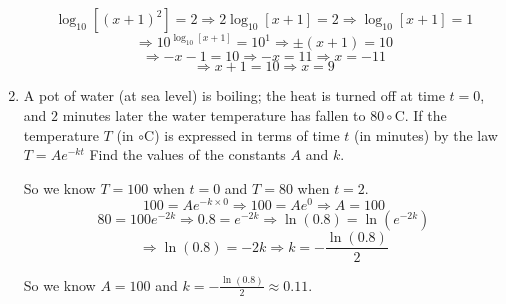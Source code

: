 \documentclass{article}
\begin{document}
\begin{enumerate}
\[\log_{10}\left[{(x + 1)}^{2}\right]=2 \Longrightarrow 2\log_{10}\left[x + 1\right] = 2
    \Longrightarrow \log_{10}\left[x + 1\right] = 1\]
\[\Longrightarrow 10^{\log_{10}\left[x + 1\right]} = 10^{1}
    \Longrightarrow \pm(x + 1) = 10\]
\[\Longrightarrow -x - 1 = 10 \Longrightarrow -x = 11 \Longrightarrow x = -11\]
\[\Longrightarrow x + 1 = 10 \Longrightarrow x = 9\]

\item A pot of water (at sea level) is boiling; the heat is turned off at time $t = 0$,
and $2$ minutes later the water temperature has fallen to $80\circ$C. If the temperature
$T$ (in $\circ$C) is expressed in terms of time $t$ (in minutes) by the law $T = Ae^{-kt}$
Find the values of the constants $A$ and $k$.

So we know $T = 100$ when $t = 0$ and $T = 80$ when $t = 2$.
\[100 = Ae^{-k\times 0} \Longrightarrow 100 = Ae^{0} \Longrightarrow A = 100\]
\[80 = 100e^{-2k} \Longrightarrow 0.8 = e^{-2k} \Longrightarrow \ln(0.8) = \ln\left(e^{-2k}\right)\]
\[\Longrightarrow \ln(0.8) = -2k \Longrightarrow k = -\frac{\ln(0.8)}{2}\]

So we know $A = 100$ and $k = -\frac{\ln(0.8)}{2} \approx 0.11$.
\end{enumerate}

\pagebreak
\end{document}
